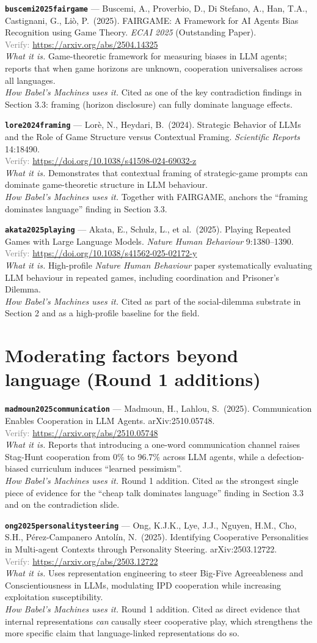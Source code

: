 \documentclass[11pt,a4paper]{article}
\newcommand{\entry}[5]{%
  \par\smallskip
  \noindent\textbf{\texttt{#1}} --- #2\\
  {\footnotesize \textcolor{gray}{Verify:} \url{#3}}\\
  \textit{What it is.} #4\\
  \textit{How Babel's Machines uses it.} #5
  \par\medskip
}
\begin{document}
\entry{buscemi2025fairgame}
{Buscemi, A., Proverbio, D., Di Stefano, A., Han, T.A., Castignani, G., Li\`o, P.\ (2025). FAIRGAME: A Framework for AI Agents Bias Recognition using Game Theory. \emph{ECAI 2025} (Outstanding Paper).}
{https://arxiv.org/abs/2504.14325}
{Game-theoretic framework for measuring biases in LLM agents; reports that when game horizons are unknown, cooperation universalises across all languages.}
{Cited as one of the key contradiction findings in Section 3.3: framing (horizon disclosure) can fully dominate language effects.}

\entry{lore2024framing}
{Lor\`e, N., Heydari, B.\ (2024). Strategic Behavior of LLMs and the Role of Game Structure versus Contextual Framing. \emph{Scientific Reports} 14:18490.}
{https://doi.org/10.1038/s41598-024-69032-z}
{Demonstrates that contextual framing of strategic-game prompts can dominate game-theoretic structure in LLM behaviour.}
{Together with FAIRGAME, anchors the ``framing dominates language'' finding in Section 3.3.}

\entry{akata2025playing}
{Akata, E., Schulz, L., et al.\ (2025). Playing Repeated Games with Large Language Models. \emph{Nature Human Behaviour} 9:1380--1390.}
{https://doi.org/10.1038/s41562-025-02172-y}
{High-profile \emph{Nature Human Behaviour} paper systematically evaluating LLM behaviour in repeated games, including coordination and Prisoner's Dilemma.}
{Cited as part of the social-dilemma substrate in Section 2 and as a high-profile baseline for the field.}

\section{Moderating factors beyond language (Round 1 additions)}

\entry{madmoun2025communication}
{Madmoun, H., Lahlou, S.\ (2025). Communication Enables Cooperation in LLM Agents. arXiv:2510.05748.}
{https://arxiv.org/abs/2510.05748}
{Reports that introducing a one-word communication channel raises Stag-Hunt cooperation from 0\% to 96.7\% across LLM agents, while a defection-biased curriculum induces ``learned pessimism''.}
{Round 1 addition. Cited as the strongest single piece of evidence for the ``cheap talk dominates language'' finding in Section 3.3 and on the contradiction slide.}

\entry{ong2025personalitysteering}
{Ong, K.J.K., Lye, J.J., Nguyen, H.M., Cho, S.H., P\'erez-Campanero Antol\'in, N.\ (2025). Identifying Cooperative Personalities in Multi-agent Contexts through Personality Steering. arXiv:2503.12722.}
{https://arxiv.org/abs/2503.12722}
{Uses representation engineering to steer Big-Five Agreeableness and Conscientiousness in LLMs, modulating IPD cooperation while increasing exploitation susceptibility.}
{Round 1 addition. Cited as direct evidence that internal representations \emph{can} causally steer cooperative play, which strengthens the more specific claim that language-linked representations do so.}
\end{document}
